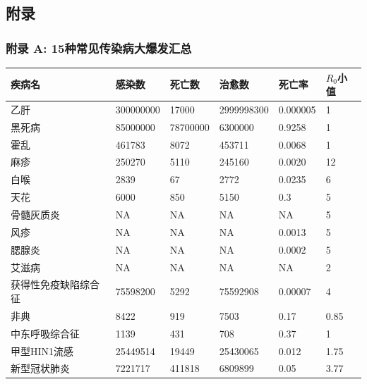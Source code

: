 \documentclass[a4paper, 11pt,twoside=true,UTF8]{scrartcl}
\begin{document}
\newpage
\subsection*{附录}
\subsubsection*{附录 A: 15种常见传染病大爆发汇总}

\begin{table}[H]
	\begin{tabular}{llllll}
		\hline
		\textbf{疾病名} & \textbf{感染数} & \textbf{死亡数} & \textbf{治愈数} & \textbf{死亡率} & \textbf{$R_0$小值} \\ \hline
		乙肝           & 300000000    & 17000        & 2999998300   & 0.000005     & 1                \\
		黑死病          & 85000000     & 78700000     & 6300000      & 0.9258       & 1                \\
		霍乱           & 461783       & 8072         & 453711       & 0.0068       & 1                \\
		麻疹           & 250270       & 5110         & 245160       & 0.0020       & 12               \\
		白喉           & 2839         & 67           & 2772         & 0.0235       & 6                \\
		天花           & 6000         & 850          & 5150         & 0.3          & 5                \\
		骨髓灰质炎        & NA           & NA           & NA           & NA           & 5                \\
		风疹           & NA           & NA           & NA           & 0.0013       & 5                \\
		腮腺炎          & NA           & NA           & NA           & 0.0002       & 5                \\
		艾滋病          & NA           & NA           & NA           & NA           & 2                \\
		获得性免疫缺陷综合征   & 75598200     & 5292         & 75592908     & 0.00007      & 4                \\
		非典           & 8422         & 919          & 7503         & 0.17         & 0.85             \\
		中东呼吸综合征      & 1139         & 431          & 708          & 0.37         & 1                \\
		甲型HIN1流感     & 25449514     & 19449        & 25430065     & 0.012        & 1.75             \\
		新型冠状肺炎       & 7221717      & 411818       & 6809899      & 0.05         & 3.77             \\ \hline
	\end{tabular}
\end{table}
\end{document}
